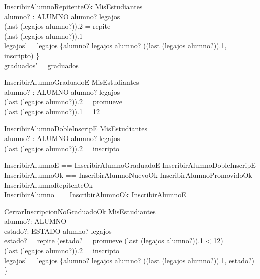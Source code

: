 \begin{schema}{InscribirAlumnoRepitenteOk}
    \Delta MisEstudiantes \\
    alumno? : ALUMNO
    \where
    alumno? \in \dom legajos \\
    (last \; (legajos \; alumno?)).2 = repite \\
    (last \; (legajos \; alumno?)).1  \\ 
    legajos' = legajos \oplus \{alumno? \mapsto legajos \; alumno? \cat \langle ((last \; (legajos \; alumno?)).1, inscripto) \rangle\} \\
    graduados' = graduados
\end{schema}

\begin{schema}{InscribirAlumnoGraduadoE}
    \Xi MisEstudiantes \\
    alumno? : ALUMNO
    \where
    alumno? \in \dom legajos \\
    (last \; (legajos \; alumno?)).2 = promueve \\
    (last \; (legajos \; alumno?)).1 = 12
\end{schema}

\begin{schema}{InscribirAlumnoDobleInscripE}
    \Xi MisEstudiantes \\
    alumno? : ALUMNO
    \where
    alumno? \in \dom legajos \\
    (last \; (legajos \; alumno?)).2 = inscripto
\end{schema}

\begin{zed}
    InscribirAlumnoE == InscribirAlumnoGraduadoE \lor InscribirAlumnoDobleInscripE \\
    InscribirAlumnoOk == InscribirAlumnoNuevoOk \lor InscribirAlumnoPromovidoOk \\ 
                         \lor InscribirAlumnoRepitenteOk \\
    InscribirAlumno == InscribirAlumnoOk \lor InscribirAlumnoE
\end{zed}

\begin{schema}{CerrarInscripcionNoGraduadoOk}
    \Delta MisEstudiantes \\
    alumno?: ALUMNO \\
    estado?: ESTADO
    \where
    alumno? \in \dom legajos \\
    estado? = repite \lor (estado? = promueve \land (last \; (legajos \; alumno?)).1 < 12) \\
    (last \; (legajos \; alumno?)).2 = inscripto \\
    legajos' = legajos \oplus \{alumno? \mapsto legajos \; alumno? \cat \langle ((last \; (legajos \; alumno?)).1, estado?) \rangle\}
\end{schema}


